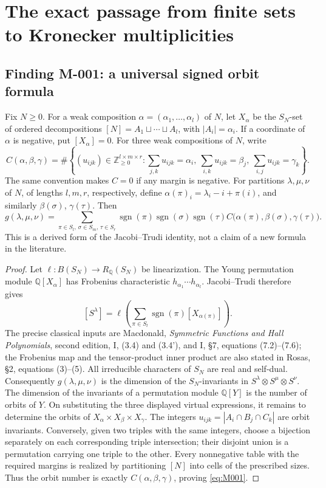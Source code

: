 \section{The exact passage from finite sets to Kronecker multiplicities}

\subsection*{Finding M-001: a universal signed orbit formula}
Fix \(N\geq 0\).  For a weak composition
\(\alpha=(\alpha_1,\ldots,\alpha_l)\) of \(N\), let
\(X_\alpha\) be the \(S_N\)-set of ordered decompositions
\([N]=A_1\sqcup\cdots\sqcup A_l\), with \(|A_i|=\alpha_i\).
If a coordinate of \(\alpha\) is negative, put \([X_\alpha]=0\).
For three weak compositions of \(N\), write
\[
 C(\alpha,\beta,\gamma)=
 \#\left\{(u_{ijk})\in\mathbb Z_{\geq0}^{l\times m\times r}:
 \sum_{j,k}u_{ijk}=\alpha_i,\ 
 \sum_{i,k}u_{ijk}=\beta_j,\ 
 \sum_{i,j}u_{ijk}=\gamma_k\right\}.
\]
The same convention makes \(C=0\) if any margin is negative.
For partitions \(\lambda,\mu,\nu\) of \(N\), of lengths \(l,m,r\),
respectively, define
\(\alpha(\pi)_i=\lambda_i-i+\pi(i)\), and similarly
\(\beta(\sigma)\), \(\gamma(\tau)\).  Then
\begin{equation}\label{eq:M001}
 g(\lambda,\mu,\nu)=
 \sum_{\pi\in S_l,\,\sigma\in S_m,\,\tau\in S_r}
 \operatorname{sgn}(\pi)\operatorname{sgn}(\sigma)
 \operatorname{sgn}(\tau)
 C\bigl(\alpha(\pi),\beta(\sigma),\gamma(\tau)\bigr).
\end{equation}
This is a derived form of the Jacobi--Trudi identity, not a claim
of a new formula in the literature.

\begin{proof}
Let \(\ell:B(S_N)\longrightarrow R_{\mathbb Q}(S_N)\) be linearization.
The Young permutation module \(\mathbb Q[X_\alpha]\) has Frobenius
characteristic \(h_{\alpha_1}\cdots h_{\alpha_l}\).
Jacobi--Trudi therefore gives
\[
 [S^\lambda]=
 \ell\left(\sum_{\pi\in S_l}
                  \operatorname{sgn}(\pi)[X_{\alpha(\pi)}]\right).
\]
The precise classical inputs are Macdonald, \emph{Symmetric Functions
and Hall Polynomials}, second edition, I, (3.4) and (3.4'), and I, \S7, equations (7.2)--(7.6);
the Frobenius map and the tensor-product inner product are also stated
in Rosas, \S2, equations (3)--(5).
All irreducible characters of \(S_N\) are real and self-dual.
Consequently \(g(\lambda,\mu,\nu)\) is the dimension of the
\(S_N\)-invariants in \(S^\lambda\otimes S^\mu\otimes S^\nu\).
The dimension of the invariants of a permutation module
\(\mathbb Q[Y]\) is the number of orbits of \(Y\).
On substituting the three displayed virtual expressions, it remains
to determine the orbits of
\(X_\alpha\times X_\beta\times X_\gamma\).
The integers \(u_{ijk}=|A_i\cap B_j\cap C_k|\) are orbit invariants.
Conversely, given two triples with the same integers, choose a
bijection separately on each corresponding triple intersection;
their disjoint union is a permutation carrying one triple to the
other.  Every nonnegative table with the required margins is realized
by partitioning \([N]\) into cells of the prescribed sizes.
Thus the orbit number is exactly \(C(\alpha,\beta,\gamma)\), proving
\eqref{eq:M001}.
\end{proof}


